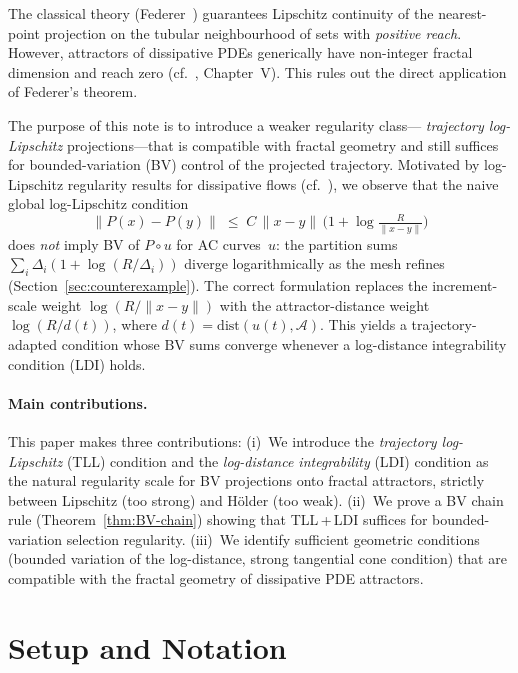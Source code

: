 \documentclass[12pt,a4paper]{article}
\theoremstyle{definition}
\theoremstyle{plain}
\theoremstyle{remark}
\newcommand{\dist}{\mathrm{dist}}
\begin{document}
The classical theory (Federer~\cite{Federer1959}) guarantees Lipschitz
continuity of the nearest-point projection on the tubular neighbourhood
of sets with \emph{positive reach}.  However, attractors of dissipative
PDEs generically have non-integer fractal dimension and reach zero
(cf.~\cite{Temam1997}, Chapter~V).  This rules out the direct
application of Federer's theorem.

The purpose of this note is to introduce a weaker regularity class---
\emph{trajectory log-Lipschitz} projections---that is compatible with
fractal geometry and still suffices for bounded-variation (BV) control
of the projected trajectory.  Motivated by log-Lipschitz regularity
results for dissipative flows
(cf.~\cite{BarbuCannone2016}), we observe that the naive
global log-Lipschitz condition
\begin{equation}\label{eq:global-LL-intro}
  \|P(x) - P(y)\|
  \;\le\;
  C\,\|x-y\|\,\bigl(1 + \log\tfrac{R}{\|x-y\|}\bigr)
\end{equation}
does \emph{not} imply BV of $P \circ u$ for AC curves~$u$: the
partition sums $\sum_i \Delta_i(1+\log(R/\Delta_i))$ diverge
logarithmically as the mesh refines (Section~\ref{sec:counterexample}).
The correct formulation replaces the increment-scale weight
$\log(R/\|x-y\|)$ with the attractor-distance weight
$\log(R/d(t))$, where $d(t) = \dist(u(t),\mathcal{A})$.  This
yields a trajectory-adapted condition whose BV sums converge
whenever a log-distance integrability condition (LDI) holds.


\paragraph{Main contributions.}
This paper makes three contributions: (i)~We introduce the \emph{trajectory log-Lipschitz} (TLL) condition and the \emph{log-distance integrability} (LDI) condition as the natural regularity scale for BV projections onto fractal attractors, strictly between Lipschitz (too strong) and H\"older (too weak). (ii)~We prove a BV chain rule (Theorem~\ref{thm:BV-chain}) showing that TLL\,+\,LDI suffices for bounded-variation selection regularity. (iii)~We identify sufficient geometric conditions (bounded variation of the log-distance, strong tangential cone condition) that are compatible with the fractal geometry of dissipative PDE attractors.


\section{Setup and Notation}
\end{document}
